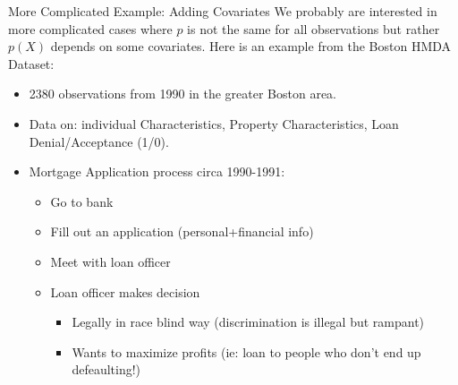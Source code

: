 \documentclass[xcolor=pdftex,dvipsnames,table,mathserif,aspectratio=169]{beamer}
\begin{document}
\begin{frame}{More Complicated Example: Adding Covariates}
We probably are interested in more complicated cases where $p$ is not the same for all observations but rather $p(X)$ depends on some covariates. Here is an example from the Boston HMDA Dataset:
\begin{itemize}
\item 2380 observations from 1990 in the greater Boston area.
\item Data on: individual Characteristics, Property Characteristics, Loan Denial/Acceptance (1/0).
\item Mortgage Application process circa 1990-1991:
\begin{itemize}
\item Go to bank
\item Fill out an application (personal+financial info)
\item Meet with loan officer
\item Loan officer makes decision
\begin{itemize}
\item Legally in race blind way (discrimination is illegal but rampant)
\item Wants to maximize profits (ie: loan to people who don't end up defeaulting!)
\end{itemize}
\end{itemize}
\end{itemize}
\end{frame}
\end{document}
